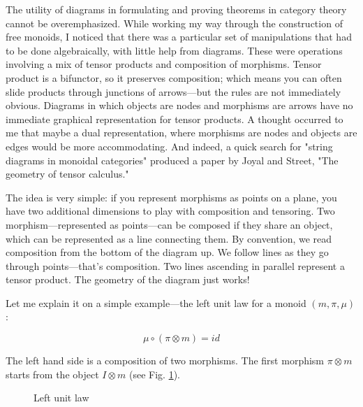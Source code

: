 \documentclass[letterpaper, 10 pt, conference]{ieeeconf}
\begin{document}
The utility of diagrams in formulating and proving theorems in category theory cannot be overemphasized. While working my way through the construction of free monoids, I noticed that there was a particular set of manipulations that had to be done algebraically, with little help from diagrams. These were operations involving a mix of tensor products and composition of morphisms. Tensor product is a bifunctor, so it preserves composition; which means you can often slide products through junctions of arrows---but the rules are not immediately obvious. Diagrams in which objects are nodes and morphisms are arrows have no immediate graphical representation for tensor products. A thought occurred to me that maybe a dual representation, where morphisms are nodes and objects are edges would be more accommodating. And indeed, a quick search for "string diagrams in monoidal categories" produced a paper by Joyal and Street, "The geometry of tensor calculus."

The idea is very simple: if you represent morphisms as points on a plane, you have two additional dimensions to play with composition and tensoring. Two morphism---represented as points---can be composed if they share an object, which can be represented as a line connecting them. By convention, we read composition from the bottom of the diagram up. We follow lines as they go through points---that's composition. Two lines ascending in parallel represent a tensor product. The geometry of the diagram just works!

Let me explain it on a simple example---the left unit law for a monoid $(m, \pi, \mu)$:

\[ \mu \circ (\pi \otimes m) = id \]

The left hand side is a composition of two morphisms. The first morphism $\pi \otimes m$ starts from the object $I \otimes m$ (see Fig. \ref{fig-lunit}). 

\begin{figure}[H]
\centering
{}
\caption{Left unit law}
\label{fig-lunit}
\end{figure}
\end{document}
